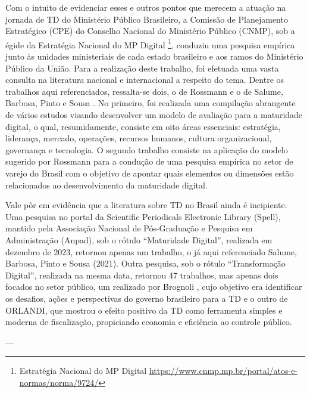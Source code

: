 Com o intuito de evidenciar esses e outros pontos que merecem a atuação na jornada de TD do Ministério Público Brasileiro, a Comissão de Planejamento Estratégico (CPE) do Conselho Nacional do Ministério Público (CNMP), sob a égide da Estratégia Nacional do MP Digital \footnote{Estratégia Nacional do MP Digital \url{https://www.cnmp.mp.br/portal/atos-e-normas/norma/9724/}}, conduziu uma pesquisa empírica junto às unidades ministeriais de cada estado brasileiro e aos ramos do Ministério Público da União. Para a realização deste trabalho, foi efetuada uma vasta consulta na literatura nacional e internacional a respeito do tema. Dentre os trabalhos aqui referenciados, ressalta-se dois, o de Rossmann \cite{rossmann2018digital} e o de Salume, Barbosa, Pinto e Sousa \cite{salume2021key}. No primeiro, foi realizada uma compilação abrangente de vários estudos visando desenvolver um modelo de avaliação para a maturidade digital, o qual, resumidamente, consiste em oito áreas essenciais: estratégia, liderança, mercado, operações, recursos humanos, cultura organizacional, governança e tecnologia. O segundo trabalho consiste na aplicação do modelo sugerido por Rossmann \cite{rossmann2018digital} para a condução de uma pesquisa empírica no setor de varejo do Brasil com o objetivo de apontar quais elementos ou dimensões estão relacionados ao desenvolvimento da maturidade digital.

Vale pôr em evidência que a literatura sobre TD no Brasil ainda é incipiente. Uma pesquisa no portal da Scientific Periodicals Electronic Library (Spell), mantido pela Associação Nacional de Pós-Graduação e Pesquisa em Administração (Anpad), sob o rótulo “Maturidade Digital”, realizada em dezembro de 2023, retornou apenas um trabalho, o já aqui referenciado Salume, Barbosa, Pinto e Sousa (2021). Outra pesquisa, sob o rótulo “Transformação Digital”, realizada na mesma data, retornou 47 trabalhos, mas apenas dois focados no setor público, um realizado por Brognoli \cite{da2020transformaccao}, cujo objetivo era identificar os desafios, ações e perspectivas do governo brasileiro para a TD e o outro de ORLANDI, que mostrou o efeito positivo da TD como ferramenta simples e moderna de fiscalização, propiciando economia e eficiência ao controle público.

---
